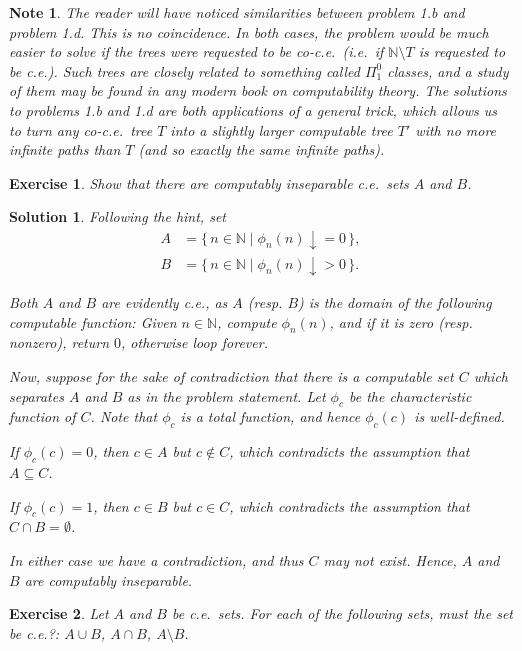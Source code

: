 \documentclass{article}
\newtheorem{ex}{Exercise}
\theoremstyle{nonumberplain}
\newtheorem{sol}{Solution}
\newtheorem{note}{Note}
\newcommand{\N}{\mathbb{N}}
\begin{document}
\begin{note}
The reader will have noticed similarities between problem 1.b and problem 1.d. This is no coincidence. In both cases, the problem would be much easier to solve if the trees were requested to be co-c.e.\ (i.e.\ if $\N \setminus T$ is requested to be c.e.). Such trees are closely related to something called $\Pi^0_1$ classes, and a study of them may be found in any modern book on computability theory. The solutions to problems 1.b and 1.d are both applications of a general trick, which allows us to turn any co-c.e.\ tree $T$ into a slightly larger computable tree $T'$ with no more infinite paths than $T$ (and so exactly the same infinite paths).
\end{note}

\begin{ex}
Show that there are computably inseparable c.e.\ sets $A$ and $B$.
\end{ex}

\begin{sol}
Following the hint, set
\begin{equation}
\begin{aligned}
A &= \{\, n \in \N \mid \phi_n(n)\downarrow = 0 \,\},\\
B &= \{\, n \in \N \mid \phi_n(n)\downarrow > 0 \,\}.
\end{aligned}
\end{equation}

Both $A$ and $B$ are evidently c.e., as $A$ (resp. $B$) is the domain of the following computable function: Given $n \in \N$, compute $\phi_n(n)$, and if it is zero (resp. nonzero), return $0$, otherwise loop forever.

Now, suppose for the sake of contradiction that there is a computable set $C$ which separates $A$ and $B$ as in the problem statement. Let $\phi_c$ be the characteristic function of $C$. Note that $\phi_c$ is a total function, and hence $\phi_c(c)$ is well-defined.

If $\phi_c(c) = 0$, then $c \in A$ but $c \not\in C$, which contradicts the assumption that $A \subseteq C$.

If $\phi_c(c) = 1$, then $c \in B$ but $c \in C$, which contradicts the assumption that $C \cap B = \emptyset$.

In either case we have a contradiction, and thus $C$ may not exist. Hence, $A$ and $B$ are computably inseparable.
\end{sol}

\begin{ex}
Let $A$ and $B$ be c.e.\ sets. For each of the following sets, must the set be c.e.?: $A \cup B$, $A \cap B$, $A \setminus B$.
\end{ex}
\end{document}
